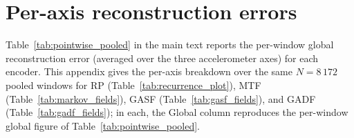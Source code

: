 \documentclass[10pt,a4paper,parskip=half-]{scrartcl}
\begin{document}
\appendix
\section{Per-axis reconstruction errors}
\label{app:per_axis_errors}

Table~\ref{tab:pointwise_pooled} in the main text reports the per-window global reconstruction error (averaged over the three accelerometer axes) for each encoder. This appendix gives the per-axis breakdown over the same $N=8\,172$ pooled windows for RP (Table~\ref{tab:recurrence_plot}), MTF (Table~\ref{tab:markov_fields}), GASF (Table~\ref{tab:gasf_fields}), and GADF (Table~\ref{tab:gadf_fields}); in each, the Global column reproduces the per-window global figure of Table~\ref{tab:pointwise_pooled}.

\begin{table}[H]
\centering
\caption{RP per-axis reconstruction errors over all $N=8\,172$ pooled windows (physical units, m/s$^2$); mean$\pm$std across windows. The Global column averages the three axes per window.}
\label{tab:recurrence_plot}
\end{table}

\begin{table}[H]
\centering
\caption{MTF per-axis reconstruction errors over all $N=8\,172$ pooled windows (physical units, m/s$^2$); mean$\pm$std across windows. The Global column averages the three axes per window.}
\label{tab:markov_fields}
\end{table}
\end{document}
